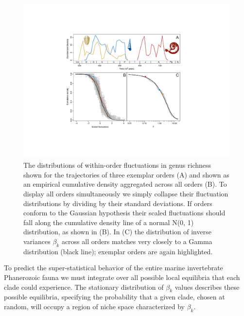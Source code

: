 \documentclass[12pt]{article}
\begin{document}
\begin{figure}[!h]
  \centering
  \includegraphics[scale=0.8]{figs/fig_pkx-fbeta.pdf}
  \caption[Variability in trajectories of within-order fluctuations in
  genus richness]{The distributions of within-order fluctuations in
    genus richness shown for the trajectories of three exemplar
    orders (A) and shown as an empirical cumulative density aggregated
    across all orders (B). To display all orders simultaneously we
    simply collapse their fluctuation distributions by dividing by
    their standard deviations. If orders conform to the Gaussian
    hypothesis their scaled fluctuations should fall along the
    cumulative density line of a normal N(0, 1) distribution, as shown
    in (B). In (C) the distribution of inverse variances $\beta_k$
    across all orders matches very closely to a Gamma distribution
    (black line); exemplar orders are again highlighted.}
  \label{fig:pk_f}
\end{figure}


To predict the super-statistical behavior of the entire marine
invertebrate Phanerozoic fauna we must integrate over all possible
local equilibria that each clade could experience. The stationary
distribution of $\beta_k$ values describes these possible equilibria,
specifying the probability that a given clade, chosen at random, will
occupy a region of niche space characterized by $\beta_k$.

\end{document}
